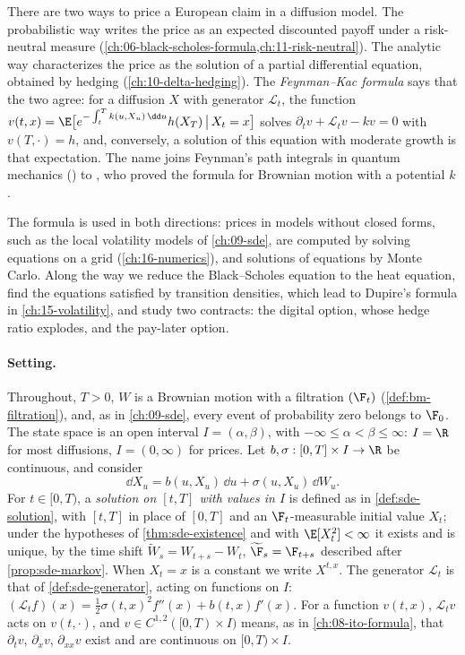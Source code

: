 
There are two ways to price a European claim in a diffusion model. The probabilistic way
writes the price as an expected discounted payoff under a risk-neutral measure
(\cref{ch:06-black-scholes-formula,ch:11-risk-neutral}). The analytic way characterizes the
price as the solution of a partial differential equation, obtained by hedging
(\cref{ch:10-delta-hedging}). The \emph{Feynman--Kac formula} says that the two agree: for a
diffusion $X$ with generator $\mathcal L_t$, the function
$v(t,x)=\E\big[e^{-\int_t^Tk(u,X_u)\,\dd u}h(X_T)\,\big|\,X_t=x\big]$ solves
$\partial_tv+\mathcal L_tv-kv=0$ with $v(T,\cdot)=h$, and, conversely, a solution of this
equation with moderate growth is that expectation. The name joins Feynman's path integrals
in quantum mechanics (\citealp{feynman-spacetime}) to \textcite{kac-wiener}, who proved the
formula for Brownian motion with a potential $k$.

The formula is used in both directions: prices in models without closed forms, such as the
local volatility models of \cref{ch:09-sde}, are computed by solving equations on a grid
(\cref{ch:16-numerics}), and solutions of equations by Monte Carlo. Along the way we reduce the
Black--Scholes equation to the heat equation, find the equations satisfied by transition
densities, which lead to Dupire's formula in \cref{ch:15-volatility}, and study two contracts:
the digital option, whose hedge ratio explodes, and the pay-later option.

\paragraph{Setting.} Throughout, $T>0$, $W$ is a Brownian motion with a filtration
$(\F_t)$ (\cref{def:bm-filtration}), and, as in \cref{ch:09-sde}, every event of probability
zero belongs to $\F_0$. The state space is an open interval $I=(\alpha,\beta)$, with
$-\infty\le\alpha<\beta\le\infty$: $I=\R$ for most diffusions, $I=(0,\infty)$ for prices. Let
$b,\sigma:[0,T]\times I\to\R$ be continuous, and consider
\begin{equation}\label{eq:fk-sde}
  \dd X_u=b(u,X_u)\,\dd u+\sigma(u,X_u)\,\dd W_u .
\end{equation}
For $t\in[0,T)$, a \emph{solution on $[t,T]$ with values in $I$} is defined as in
\cref{def:sde-solution}, with $[t,T]$ in place of $[0,T]$ and an $\F_t$-measurable initial value
$X_t$; under the hypotheses of \cref{thm:sde-existence} and with $\E[X_t^2]<\infty$ it exists and is
unique, by the time shift $\widetilde W_s=W_{t+s}-W_t$, $\widetilde\F_s=\F_{t+s}$ described after
\cref{prop:sde-markov}. When $X_t=x$ is a constant we write $X^{t,x}$. The generator
$\mathcal L_t$ is that of \cref{def:sde-generator}, acting on functions on $I$:
$(\mathcal L_tf)(x)=\frac12\sigma(t,x)^2f''(x)+b(t,x)f'(x)$. For a function $v(t,x)$,
$\mathcal L_tv$ acts on $v(t,\cdot)$, and $v\in C^{1,2}([0,T)\times I)$ means, as in
\cref{ch:08-ito-formula}, that $\partial_tv$, $\partial_xv$, $\partial_{xx}v$ exist and are continuous
on $[0,T)\times I$.

